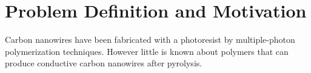 
\chapter{Problem Definition and Motivation} %

\label{Chapter:ProblemDefinitionandMotivation}

Carbon nanowires have been fabricated with a photoresist by multiple-photon polymerization techniques. However little is known about polymers that can produce conductive carbon nanowires after pyrolysis.











